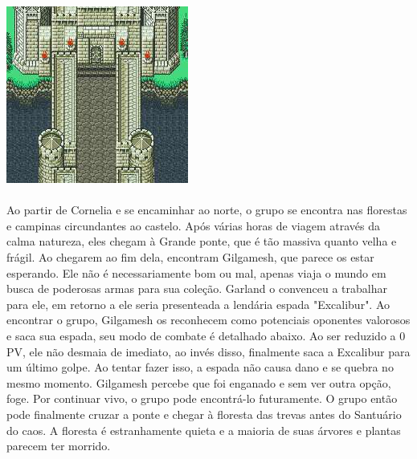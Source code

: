 \includegraphics[width=\columnwidth]{./art/chaosincornelia/bridge.jpg} 
%
\vfill
%
\\\\
%
Ao partir de Cornelia e se encaminhar ao norte, o grupo se encontra nas florestas e campinas circundantes ao castelo.
Após várias horas de viagem através da calma natureza, eles chegam à Grande ponte, que é tão massiva quanto velha e frágil.
Ao chegarem ao fim dela, encontram Gilgamesh, que parece os estar esperando.
Ele não é necessariamente bom ou mal, apenas viaja o mundo em busca de poderosas armas para sua coleção.
Garland o convenceu a trabalhar para ele, em retorno a ele seria presenteada a lendária espada "Excalibur".
Ao encontrar o grupo, Gilgamesh os reconhecem como potenciais oponentes valorosos e saca sua espada, seu modo de combate é detalhado abaixo.
Ao ser reduzido a 0 PV, ele não desmaia de imediato, ao invés disso, finalmente saca a Excalibur para um último golpe.
Ao tentar fazer isso, a espada não causa dano e se quebra no mesmo momento. Gilgamesh percebe que foi enganado e sem ver outra opção, foge.
Por continuar vivo, o grupo pode encontrá-lo futuramente.
O grupo então pode finalmente cruzar a ponte e chegar à floresta das trevas antes do Santuário do caos.
A floresta é estranhamente quieta e a maioria de suas árvores e plantas parecem ter morrido.
